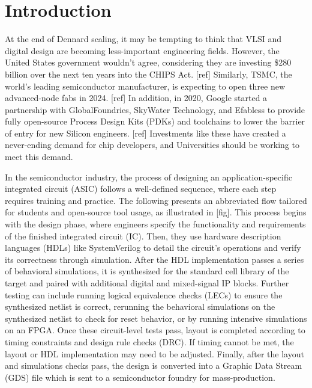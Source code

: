 
\chapter{Introduction}
\label{chapter:introduction}

At the end of Dennard scaling, it may be tempting to think that VLSI and digital design are becoming less-important engineering fields. However, the United States government wouldn't agree, considering they are investing \$280 billion over the next ten years into the CHIPS Act. [ref] Similarly, TSMC, the world's leading semiconductor manufacturer, is expecting to open three new advanced-node fabs in 2024. [ref] In addition, in 2020, Google started a partnership with GlobalFoundries, SkyWater Technology, and Efabless to provide fully open-source Process Design Kits (PDKs) and toolchains to lower the barrier of entry for new Silicon engineers. [ref] Investments like these have created a never-ending demand for chip developers, and Universities should be working to meet this demand.

In the semiconductor industry, the process of designing an application-specific integrated circuit (ASIC) follows a well-defined sequence, where each step requires training and practice. The following presents an abbreviated flow tailored for students and open-source tool usage, as illustrated in [fig]. This process begins with the design phase, where engineers specify the functionality and requirements of the finished integrated circuit (IC). Then, they use hardware description languages (HDLs) like SystemVerilog to detail the circuit's operations and verify its correctness through simulation. After the HDL implementation passes a series of behavioral simulations, it is synthesized for the standard cell library of the target and paired with additional digital and mixed-signal IP blocks. Further testing can include running logical equivalence checks (LECs) to ensure the synthesized netlist is correct, rerunning the behavioral simulations on the synthesized netlist to check for reset behavior, or by running intensive simulations on an FPGA. Once these circuit-level tests pass, layout is completed according to timing constraints and design rule checks (DRC). If timing cannot be met, the layout or HDL implementation may need to be adjusted. Finally, after the layout and simulations checks pass, the design is converted into a Graphic Data Stream (GDS) file which is sent to a semiconductor foundry for mass-production.

